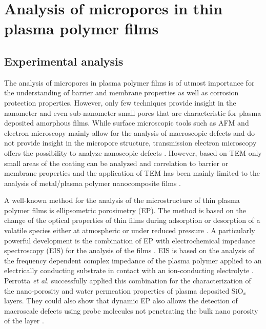 \documentclass[AMA,STIX2COL]{WileyNJD-v2} %
\begin{document}

\section{Analysis of micropores in thin plasma polymer films}\label{sec3}

\subsection{Experimental analysis}\label{subsec31}


The analysis of micropores in plasma polymer films is of utmost importance for the understanding of barrier and membrane properties as well as corrosion protection properties. However, only few techniques provide insight in the nanometer and even sub-nanometer small pores that are characteristic for plasma deposited amorphous films. While surface microscopic tools such as AFM and electron microscopy mainly allow for the analysis of macroscopic defects and do not provide insight in the micropore structure, transmission electron microscopy offers the possibility to analyze nanoscopic defects \cite{Kuo.2015}. However, based on TEM only small areas of the coating can be analyzed and correlation to barrier or membrane properties and the application of TEM has been mainly limited to the analysis of metal/plasma polymer nanocomposite films \cite{Alissawi.2013}.

A well-known method for the analysis of the microstructure of thin plasma polymer films is ellipsometric porosimetry (EP). The method is based on the change of the optical properties of thin films during adsorption or desorption of a volatile species either at atmospheric or under reduced pressure \cite{Perrotta.2015}. A particularly powerful development is the combination of EP with electrochemical impedance spectroscopy (EIS) for the analysis of the films \cite{Perrotta.2015}. EIS is based on the analysis of the frequency dependent complex impedance of the plasma polymer applied to an electrically conducting substrate in contact with an ion-conducting electrolyte \cite{Perrotta.2015,Perrotta.2015b}. Perrotta \textit{et al.} successfully applied this combination for the characterization of the nano-porosity and water permeation properties of plasma deposited SiO$_x$ layers. They could also show that dynamic EP also allows the detection of macroscale defects  using probe molecules not penetrating the bulk nano porosity of the layer \cite{Perrotta.2016}.
\end{document}
